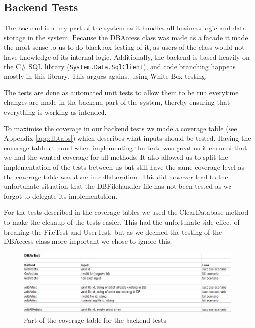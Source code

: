 \subsection{Backend Tests}
The backend is a key part of the system as it handles all business logic and data storage in the system. Because 
the DBAccess class was made as a facade it made the most sense to us to do blackbox testing of it, as users of
the class would not have knowledge of its internal logic. Additionally, the backend is based heavily on the C\#
SQL library (\verb+System.Data.SqlClient+), and code branching happens mostly in this library. This argues against
using White Box testing.

The tests are done as automated unit tests to allow them
to be run everytime changes are made in the backend part of the system, thereby ensuring that everything is working as
intended.

To maximise the coverage in our backend tests we made a coverage table
(see Appendix \ref{app:dbtabs}) which describes what inputs should be tested.
Having the coverage table at hand when implementing the tests was great as it
ensured that we had the wanted coverage for all methods. It also allowed us to
split the implementation of the tests between us but still have the same
coverage level as the coverage table was done in collaboration. This did 
however lead to the unfortunate situation that the DBFilehandler file has not
been tested as we forgot to delegate its implementation.

For the tests described in the coverage tables we used the ClearDatabase method
to make the cleanup of the tests easier. This had the unfortunate side effect of
breaking the FileTest and UserTest, but as we deemed the testing of the DBAccess
class more important we chose to ignore this. 
\begin{figure}[hbt]
	\centering
	\includegraphics[scale=0.52]{./testing/coverage.jpg}
	\caption{Part of the coverage table for the backend tests}
	\label{fig:covtabs}
\end{figure}
